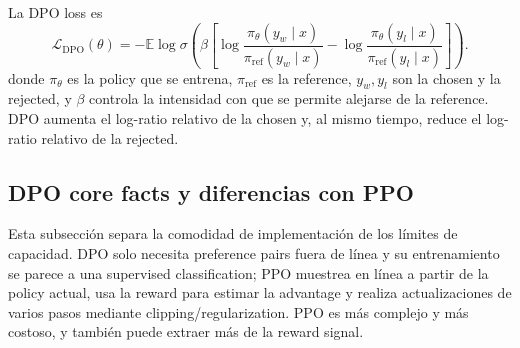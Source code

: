 

La DPO loss es
\[
\mathcal{L}_{\mathrm{DPO}}(\theta)=-\mathbb{E}\log\sigma\!\left(
\beta\left[
\log\frac{\pi_{\theta}(y_w\mid x)}{\pi_{\mathrm{ref}}(y_w\mid x)}-
\log\frac{\pi_{\theta}(y_l\mid x)}{\pi_{\mathrm{ref}}(y_l\mid x)}
\right]\right).
\]
donde $\pi_{\theta}$ es la policy que se entrena, $\pi_{\mathrm{ref}}$ es la reference, $y_w,y_l$ son la chosen y la rejected, y $\beta$ controla la intensidad con que se permite alejarse de la reference. DPO aumenta el log-ratio relativo de la chosen y, al mismo tiempo, reduce el log-ratio relativo de la rejected.


\subsection{DPO core facts y diferencias con PPO}

Esta subsección separa la comodidad de implementación de los límites de capacidad. DPO solo necesita preference pairs fuera de línea y su entrenamiento se parece a una supervised classification; PPO muestrea en línea a partir de la policy actual, usa la reward para estimar la advantage y realiza actualizaciones de varios pasos mediante clipping/regularization. PPO es más complejo y más costoso, y también puede extraer más de la reward signal.



